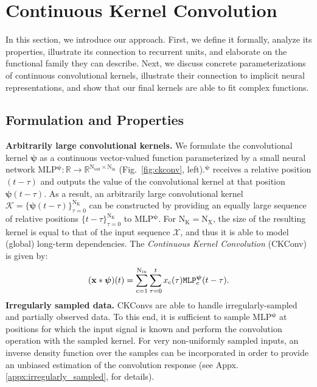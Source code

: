 \documentclass{article}
\def\gK{{\mathcal{K}}}
\def\gX{{\mathcal{X}}}
\def\sR{{\mathbb{R}}}
\renewcommand{\vec}[1]{\ensuremath{\mathbf{\MakeLowercase{{#1}}}}}
\newcommand{\xv}{\vec{x}}
\def\ct{\mathrm{c}}
\def\Nt{\mathrm{N}}
\def\Kt{\mathrm{K}}
\def\Xt{\mathrm{X}}
\def\gK{{\mathcal{K}}}
\def\gX{{\mathcal{X}}}
\def\sR{{\mathbb{R}}}
\newcommand{\mlp}{{\btt MLP}}
\begin{document}
\section{Continuous Kernel Convolution}\label{sec:continuous_kernel_conv}
\vspace{-2mm}
In this section, we introduce our approach. First, we define it formally, analyze its properties, illustrate its connection to recurrent units, and elaborate on the functional family they can describe. Next, we discuss concrete parameterizations of continuous convolutional kernels, illustrate their connection to implicit neural representations, and show that our final kernels are able to fit complex functions.
\vspace{-2mm}
\subsection{Formulation and Properties}\label{sec:overview}
\vspace{-2mm}
\textbf{Arbitrarily large convolutional kernels.} We formulate the convolutional kernel $\boldsymbol{\psi}$ as a continuous vector-valued function parameterized by a small neural network \mlp$^{\boldsymbol{\psi}}: \sR \rightarrow \sR^{\Nt_{\mathrm{out}} \times \Nt_{\mathrm{in}}}$ (Fig.~\ref{fig:ckconv}, left).\break \mlp$^{\boldsymbol{\psi}}$ receives a relative position $(t {-}\tau)$ and outputs the value of the convolutional kernel at that position $\boldsymbol{\psi}(t {-} \tau)$. As a result, an arbitrarily large convolutional kernel $\gK {=} \{\boldsymbol{\psi}(t {-} \tau)\}_{\tau {=} 0}^{\Nt_{\Kt}}$ can be constructed by providing an equally large sequence of relative positions $\{ t {-} \tau \}_{\tau = 0}^{\Nt_{\Kt}}$ to \mlp$^{\boldsymbol{\psi}}$.
For $\Nt_{\Kt} {=} \Nt_{\Xt}$, the size of the resulting kernel is equal to that of the input sequence $\gX$, and thus it is able to model (global) long-term dependencies.
The \textit{Continuous Kernel Convolution} (CKConv) is given by:
\begin{equation}
\setlength{\abovedisplayskip}{2pt}
\setlength{\belowdisplayskip}{3pt}
    (\xv * \boldsymbol{\psi}) (t) = \sum_{\ct = 1}^{\Nt_{\mathrm{in}}} \sum_{\tau = 0}^{t} x_{\ct}(\tau) \texttt{MLP}^{\boldsymbol{\psi}}_{\ct}(t - \tau).
\end{equation}
\textbf{Irregularly sampled data.} CKConvs are able to handle irregularly-sampled and partially observed data. To this end, it is sufficient to sample \mlp$^{\boldsymbol{\psi}}$ at positions for which the input signal is known and perform the convolution operation with the sampled kernel. For very non-uniformly sampled inputs, an inverse density function over the samples can be incorporated in order to provide an unbiased estimation of the convolution response (see Appx. \ref{appx:irregularly_sampled}, \citet{wu2019pointconv} for details). 
\end{document}
